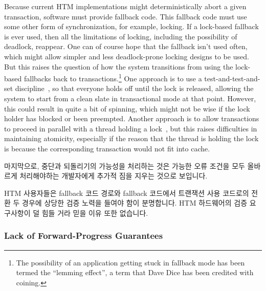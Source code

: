 Because current HTM implementations might deterministically abort a
given transaction, software must provide fallback code.
This fallback code must use some other form of synchronization, for
example, locking.
If a lock-based fallback is ever used, then all the limitations of locking,
including the possibility of deadlock, reappear.
One can of course hope that the fallback isn't used often, which might
allow simpler and less deadlock-prone locking designs to be used.
But this raises the question of how the system transitions from using
the lock-based fallbacks back to transactions.\footnote{
	The possibility of an application getting stuck in fallback
	mode has been termed the ``lemming effect'', a term that
	Dave Dice has been credited with coining.}
One approach is to use a test-and-test-and-set discipline~\cite{Martinez02a},
so that everyone holds off until the lock is released, allowing the
system to start from a clean slate in transactional mode at that point.
However, this could result in quite a bit of spinning, which might not
be wise if the lock holder has blocked or been preempted.
Another approach is to allow transactions to proceed in parallel with
a thread holding a lock~\cite{Martinez02a}, but this raises difficulties
in maintaining atomicity, especially if the reason that the thread is
holding the lock is because the corresponding transaction would not fit
into cache.

\fi

마지막으로, 중단과 되돌리기의 가능성을 처리하는 것은 가능한 오류 조건을 모두
올바르게 처리해야하는 개발자에게 추가적 짐을 지우는 것으로 보입니다.

HTM 사용자들은 fallback 코드 경로와 fallback 코드에서 트랜잭션 사용 코드로의
전환 두 경우에 상당한 검증 노력을 들여야 함이 분명합니다.
HTM 하드웨어의 검증 요구사항이 덜 힘들 거라 믿을 이유 또한 없습니다.

\iffalse

Finally, dealing with the possibility of aborts and rollbacks seems to
put an additional burden on the developer, who must correctly handle
all combinations of possible error conditions.

It is clear that users of HTM must put considerable validation effort
into testing both the fallback code paths and transition from fallback
code back to transactional code.
Nor is there any reason to believe that the validation requirements of
HTM hardware are any less daunting.

\fi

\subsubsection{Lack of Forward-Progress Guarantees}
\label{sec:future:Lack of Forward-Progress Guarantees}

